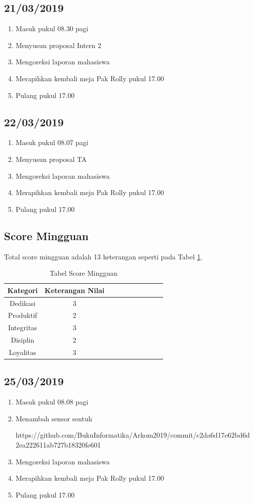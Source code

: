 \subsection{21/03/2019}
\begin{enumerate}
  \item Masuk pukul 08.30 pagi
  \item Menyusun proposal Intern 2
  \item Mengoreksi laporan mahasiswa
 \item Merapihkan kembali meja Pak Rolly pukul 17.00
  \item Pulang pukul 17.00 
\end{enumerate}

\subsection{22/03/2019}
\begin{enumerate}
  \item Masuk pukul 08.07 pagi
  \item Menyusun proposal TA
  \item Mengoreksi laporan mahasiswa
 \item Merapihkan kembali meja Pak Rolly pukul 17.00
  \item Pulang pukul 17.00 
\end{enumerate}

\subsection{Score Mingguan}
Total score mingguan adalah 13 keterangan seperti pada Tabel \ref{table:scoremingguan3}.
\begin{table}[!ht]
\centering
\begin{tabular}{ |c|c|c|c|c|c|c|c|c|c| }
\hline
Kategori & Keterangan Nilai \\
\hline
Dedikasi & 3 \\
\hline
Produktif & 2 \\
\hline
Integritas & 3 \\
\hline
Disiplin & 2 \\
\hline
Loyalitas & 3 \\
\hline
\end{tabular}
\caption{Tabel Score Mingguan}
\label{table:scoremingguan3}
\end{table}


\subsection{25/03/2019}
\begin{enumerate}
  \item Masuk pukul 08.08 pagi
  \item Menambah sensor sentuh
\par https://github.com/BukuInformatika/Arkom2019/commit/c2da6d17e62bd6d2ea222611ab727b18320fe601
  \item Mengoreksi laporan mahasiswa
 \item Merapihkan kembali meja Pak Rolly pukul 17.00
  \item Pulang pukul 17.00 
\end{enumerate}

